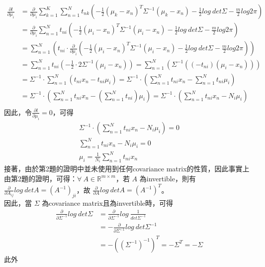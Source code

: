 \documentclass{article}
\begin{document}
\begin{align*}
    \frac{\partial l}{\partial \mu_i} &= \frac{\partial}{\partial \mu_i} \sum_{k = 1}^K \sum_{n = 1}^N t_{nk} (-\frac{1}{2} (\mu_k - x_n)^T \Sigma^{-1} (\mu_k - x_n) - \frac{1}{2} log\ det \Sigma - \frac{m}{2} log 2 \pi)\\
    &= \frac{\partial}{\partial \mu_i} \sum_{n = 1}^N t_{ni} (-\frac{1}{2} (\mu_i - x_n)^T \Sigma^{-1} (\mu_i - x_n) - \frac{1}{2} log\ det \Sigma - \frac{m}{2} log 2 \pi)\\
    &= \sum_{n = 1}^N (t_{ni} \cdot \frac{\partial}{\partial \mu_i} (-\frac{1}{2} (\mu_i - x_n)^T \Sigma^{-1} (\mu_i - x_n) - \frac{1}{2} log\ det \Sigma - \frac{m}{2} log 2 \pi))\\
    &= \sum_{n = 1}^N t_{ni} (-\frac{1}{2} \cdot 2 \Sigma^{-1} (\mu_i - x_n)) = \sum_{n = 1}^N (\Sigma^{-1}((-t_{ni})(\mu_i - x_n)))\\
    &= \Sigma^{-1} \cdot \sum_{n = 1}^N (t_{ni} x_n - t_{ni} \mu_i) = \Sigma^{-1} \cdot (\sum_{n = 1}^N t_{ni} x_n - \sum_{n = 1}^N t_{ni} \mu_i)\\
    &= \Sigma^{-1} \cdot (\sum_{n = 1}^N t_{ni} x_n - (\sum_{n = 1}^N t_{ni}) \mu_i) = \Sigma^{-1} \cdot (\sum_{n = 1}^N t_{ni} x_n - N_i \mu_i)\\
\end{align*}
因此，令$\frac{\partial l}{\partial \mu_i} = 0$，可得
\begin{gather*}
    \Sigma^{-1} \cdot (\sum_{n = 1}^N t_{ni} x_n - N_i \mu_i) = 0\\
    \sum_{n = 1}^N t_{ni} x_n - N_i \mu_i = 0\\
    \mu_i = \frac{1}{N_i} \sum_{n = 1}^N t_{ni} x_n
\end{gather*}
接著，由於第2題的證明中並未使用到任何covariance matrix的性質，因此事實上由第2題的證明，可得：$\forall\ A \in {\mathbb R}^{m \times m}$，若 $A$ 為invertible，則有 $\frac{\partial}{\partial A_{ij}} log\ det A = (A^{-1})_{ji}$，故 $\frac{\partial}{\partial A} log\ det A = (A^{-1})^T$。\\
因此，當 $\Sigma$ 為covariance matrix且為invertible時，可得
\begin{align*}
    \frac{\partial}{\partial \Sigma^{-1}} log\ det \Sigma &= \frac{\partial}{\partial \Sigma^{-1}} log\ \frac{1}{det \Sigma^{-1}}\\
    &= -\frac{\partial}{\partial \Sigma^{-1}} log\ det \Sigma^{-1}\\
    &= -((\Sigma^{-1})^{-1})^T = -\Sigma^T = -\Sigma
\end{align*}
此外
\end{document}
